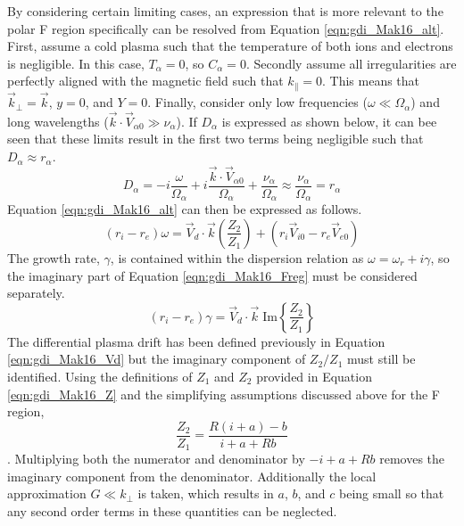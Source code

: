By considering certain limiting cases, an expression that is more relevant to the polar F region specifically can be resolved from Equation \ref{eqn:gdi_Mak16_alt}.  First, assume a cold plasma such that the temperature of both ions and electrons is negligible.  In this case, \(T_\alpha = 0\), so \(C_\alpha = 0\).  Secondly assume all irregularities are perfectly aligned with the magnetic field such that \(k_\parallel = 0\).  This means that \(\vec{k}_\perp = \vec{k}\), \(y=0\), and \(Y=0\).  Finally, consider only low frequencies (\(\omega \ll \Omega_\alpha\)) and long wavelengths (\(\vec{k}\cdot\vec{V}_{\alpha 0} \gg \nu_\alpha\)).  If \(D_\alpha\) is expressed as shown below, it can bee seen that these limits result in the first two terms being negligible such that \(D_\alpha \approx r_\alpha\).
\begin{equation}
	D_\alpha = -i\frac{\omega}{\Omega_\alpha} + i\frac{\vec{k}\cdot\vec{V}_{\alpha 0}}{\Omega_\alpha} + \frac{\nu_\alpha}{\Omega_\alpha} \approx \frac{\nu_\alpha}{\Omega_\alpha} = r_\alpha
\end{equation}
Equation \ref{eqn:gdi_Mak16_alt} can then be expressed as follows.
\begin{equation}
	\label{eqn:gdi_Mak16_Freg}
	(r_i-r_e)\omega = \vec{V}_d\cdot\vec{k}\left(\frac{Z_2}{Z_1}\right)+(r_i\vec{V}_{i0}-r_e\vec{V}_{e0})
\end{equation}
The growth rate, \(\gamma\), is contained within the dispersion relation as \(\omega = \omega_r+i\gamma\), so the imaginary part of Equation \ref{eqn:gdi_Mak16_Freg} must be considered separately.
\begin{equation}
	\label{eqn:gdi_Mak16_gam}
	(r_i-r_e)\gamma = \vec{V}_d\cdot\vec{k}\;\text{Im}\left\{\frac{Z_2}{Z_1}\right\}
\end{equation}
The differential plasma drift has been defined previously in Equation \ref{eqn:gdi_Mak16_Vd} but the imaginary component of \(Z_2/Z_1\) must still be identified.  Using the definitions of \(Z_1\) and \(Z_2\) provided in Equation \ref{eqn:gdi_Mak16_Z} and the simplifying assumptions discussed above for the F region,
\begin{equation}
	\frac{Z_2}{Z_1} = \frac{R(i+a)-b}{i+a+Rb}
\end{equation}.
Multiplying both the numerator and denominator by \(-i+a+Rb\) removes the imaginary component from the denominator.  Additionally the local approximation \(G \ll k_\perp\) is taken, which results in \(a\), \(b\), and \(c\) being small so that any second order terms in these quantities can be neglected.
